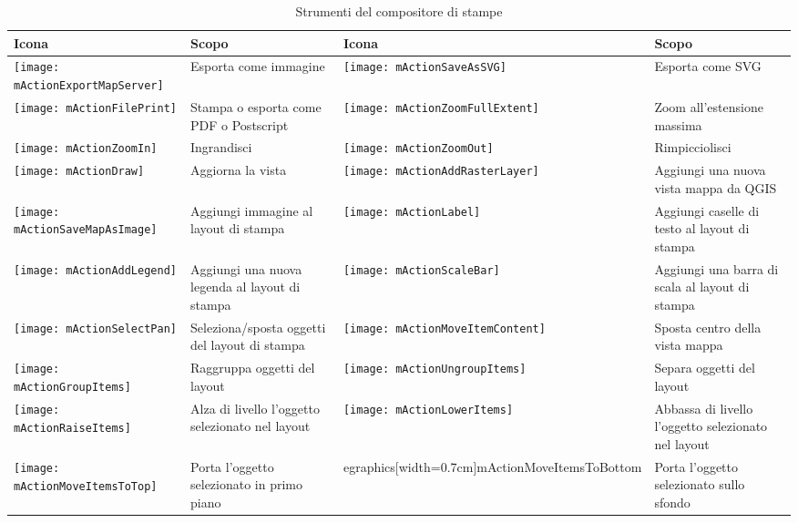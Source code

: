 \begin{table}[h]
\centering
\caption{Strumenti del compositore di stampe}\label{tab:printcomposer_tools}\medskip
 \begin{tabular}{|l|p{6.9cm}|l|p{6.9cm}|}
 \hline \textbf{Icona} & \textbf{Scopo} & \textbf{Icona} &
 \textbf{Scopo} \\

 \hline \texttt{[image: mActionExportMapServer]}
 & Esporta come immagine & 
 \texttt{[image: mActionSaveAsSVG]} & Esporta come SVG \\
 \hline \texttt{[image: mActionFilePrint]} & Stampa o esporta
 come PDF o Postscript &
 \texttt{[image: mActionZoomFullExtent]} & Zoom all'estensione
 massima \\
 \hline \texttt{[image: mActionZoomIn]} & Ingrandisci &
 \texttt{[image: mActionZoomOut]} & Rimpicciolisci \\
 \hline \texttt{[image: mActionDraw]} & Aggiorna la vista &
 \texttt{[image: mActionAddRasterLayer]} & Aggiungi una nuova
 vista mappa da QGIS \\
 \hline \texttt{[image: mActionSaveMapAsImage]} & Aggiungi
 immagine al layout di stampa &
 \texttt{[image: mActionLabel]} & Aggiungi caselle di testo al
 layout di stampa \\
 \hline \texttt{[image: mActionAddLegend]} & Aggiungi una nuova
 legenda al layout di stampa & 
 \texttt{[image: mActionScaleBar]} & Aggiungi una barra di scala
 al layout di stampa\\
 \hline \texttt{[image: mActionSelectPan]} & Seleziona/sposta
 oggetti del layout di stampa &
 \texttt{[image: mActionMoveItemContent]} & Sposta centro della
 vista mappa \\
 \hline \texttt{[image: mActionGroupItems]} & Raggruppa oggetti
 del layout & 
 \texttt{[image: mActionUngroupItems]} & Separa oggetti del
 layout \\
 \hline \texttt{[image: mActionRaiseItems]} & Alza di livello
 l'oggetto selezionato nel layout &
 \texttt{[image: mActionLowerItems]} & Abbassa di livello
 l'oggetto selezionato nel layout \\
 \hline \texttt{[image: mActionMoveItemsToTop]} & Porta l'oggetto
 selezionato in primo piano & 
egraphics[width=0.7cm]{mActionMoveItemsToBottom} & Porta l'oggetto
 selezionato sullo sfondo \\
\hline
\end{tabular}
\end{table}

